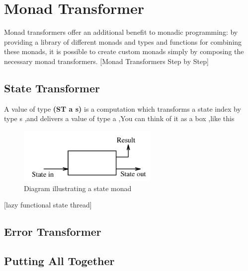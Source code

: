\chapter{Monad Transformer}

Monad transformers offer an additional benefit to monadic programming: by providing a
library of different monads and types and functions for combining these monads, it is possible
to create custom monads simply by composing the necessary monad transformers. [Monad Transformers Step by Step]

\section{State Transformer}
A value of type \textbf{(ST a s)} is a computation which transforms a state index by type s ,and delivers a value of type a ,You can think of it as a box ,like this 

\begin{figure}[H]
  \centering
	\includegraphics[width=0.60\textwidth]{pic/c3/state.png}
	\caption{Diagram illustrating a state monad}
\end{figure}
[lazy functional state thread]


\section{Error Transformer}


\section{Putting All Together}